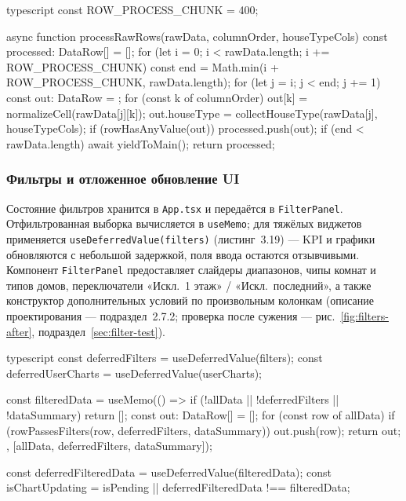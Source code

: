 \begin{singleminted}{typescript}
const ROW_PROCESS_CHUNK = 400;

async function processRawRows(rawData, columnOrder, houseTypeCols) {
    const processed: DataRow[] = [];
    for (let i = 0; i < rawData.length; i += ROW_PROCESS_CHUNK) {
        const end = Math.min(i + ROW_PROCESS_CHUNK, rawData.length);
        for (let j = i; j < end; j += 1) {
            const out: DataRow = {};
            for (const k of columnOrder) {
                out[k] = normalizeCell(rawData[j][k]);
            }
            out.houseType = collectHouseType(rawData[j], houseTypeCols);
            if (rowHasAnyValue(out)) processed.push(out);
        }
        if (end < rawData.length) await yieldToMain();
    }
    return processed;
}
\end{singleminted}
\label{lst:csv-import}

\subsubsection{Фильтры и отложенное обновление UI}

Состояние фильтров хранится в \texttt{App.tsx} и передаётся в \texttt{FilterPanel}. Отфильтрованная выборка вычисляется в \texttt{useMemo}; для тяжёлых виджетов применяется \texttt{useDeferredValue(filters)} (листинг~3.19) --- KPI и графики обновляются с небольшой задержкой, поля ввода остаются отзывчивыми. Компонент \texttt{FilterPanel} предоставляет слайдеры диапазонов, чипы комнат и типов домов, переключатели «Искл.~1 этаж» / «Искл.~последний», а также конструктор дополнительных условий по произвольным колонкам (описание проектирования --- подраздел~2.7.2; проверка после сужения --- рис.~\ref{fig:filters-after}, подраздел~\ref{sec:filter-test}).

\begin{singleminted}{typescript}
const deferredFilters = useDeferredValue(filters);
const deferredUserCharts = useDeferredValue(userCharts);

const filteredData = useMemo(() => {
    if (!allData || !deferredFilters || !dataSummary) return [];
    const out: DataRow[] = [];
    for (const row of allData) {
        if (rowPassesFilters(row, deferredFilters, dataSummary)) out.push(row);
    }
    return out;
}, [allData, deferredFilters, dataSummary]);

const deferredFilteredData = useDeferredValue(filteredData);
const isChartUpdating =
    isPending || deferredFilteredData !== filteredData;
\end{singleminted}
\label{lst:deferred-filters}

